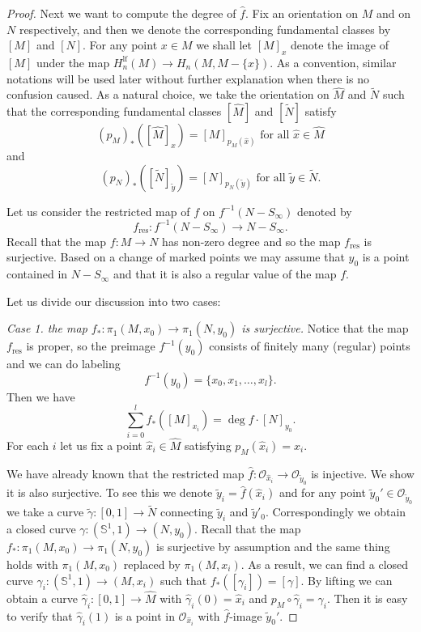 \documentclass[10pt,a4paper]{amsart}
\begin{document}
\begin{proof}
Next we want to compute the degree of $\hat f$.
Fix an orientation on $M$ and on $N$ respectively, and then we denote the corresponding fundamental classes by $[M]$ and $[N]$. For any point $x\in M$ we shall let $[M]_x$ denote the image of $[M]$ under the map $H_n^{\mathrm{lf}}(M)\to H_n(M,M-\{x\})$. As a convention, similar notations will be used later without further explanation when there is no confusion caused. As a natural choice, we take the orientation on $\widehat M$ and $\tilde N$ such that the corresponding fundamental classes $[\widehat M]$ and $[\tilde N]$ satisfy
$$
(p_M)_{*}([\widehat M]_{\hat x})=[M]_{p_M(\hat x)} \mbox{ for all }\hat x\in \widehat M
$$
and
$$
(p_N)_{*}([\tilde N]_{\tilde y})=[N]_{p_N(\tilde y)} \mbox{ for all }\tilde y\in \tilde N.
$$

Let us consider the restricted map of $f$ on $f^{-1}(N-S_\infty)$ denoted by
$$
f_{\mathrm{res}}:f^{-1}(N-S_\infty)\to N-S_\infty.
$$
Recall that the map $f:M\to N$ has non-zero degree and so the map $f_{\mathrm{res}}$
is surjective. Based on a change of marked points we may assume that $y_0 $ is a point contained in $ N-S_\infty$ and that it is also a regular value of the map $f$.

Let us divide our discussion into two cases:

\medskip
{\it Case 1. the map $f_*:\pi_1(M,x_0)\to \pi_1(N,y_0)$ is surjective.} Notice that the map $f_{\mathrm{res}}$ is proper, so the preimage $f^{-1}(y_0)$ consists of finitely many (regular) points and we can do labeling
$$
f^{-1}(y_0)=\{x_0,x_1,\ldots,x_l\}.
$$
Then we have
$$
\sum_{i=0}^lf_*([M]_{x_i})=\deg f\cdot [N]_{y_0}.
$$
For each $i$ let us fix a point $\hat x_i\in\widehat M$ satisfying $p_M(\hat x_i)=x_i$.

We have already known that the restricted map $\hat f:\mathcal O_{\hat x_i}\to \mathcal O_{\tilde y_0}$ is injective. We show it is also surjective. To see this we denote $\tilde y_i=\hat f(\hat x_i)$ and for any point $\tilde y_0'\in\mathcal O_{\tilde{y}_0}$ we take a curve $\tilde \gamma:[0,1]\to \tilde N$ connecting $\tilde y_i$ and $\tilde y'_0$. Correspondingly we obtain a closed curve $\gamma:(\mathbb S^1,1)\to (N,y_0)$. Recall that the map $f_*: \pi_1(M,x_0)\to \pi_1(N,y_0)$ is surjective by assumption and the same thing holds with $\pi_1(M,x_0)$ replaced by $\pi_1(M,x_i)$. As a result, we can find a closed curve $\gamma_i:(\mathbb S^1,1)\to (M,x_i)$ such that $f_*([\gamma_i])=[\gamma]$. By lifting we can obtain a curve $\hat\gamma_i:[0,1]\to \widehat M$ with $\hat\gamma_i(0)=\hat x_i$ and $p_M\circ \hat\gamma_i=\gamma_i$. Then it is easy to verify that $\hat\gamma_i(1)$ is a point in $\mathcal O_{\hat x_i}$ with $\hat f$-image $\tilde y_0'$.


\end{proof}
\end{document}

